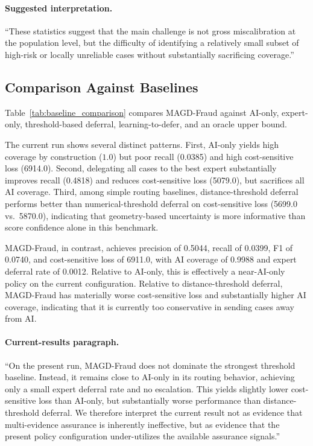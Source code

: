 \paragraph{Suggested interpretation.}
``These statistics suggest that the main challenge is not gross miscalibration at the population level, but the difficulty of identifying a relatively small subset of high-risk or locally unreliable cases without substantially sacrificing coverage.''

\subsection{Comparison Against Baselines}
\label{subsec:results_baselines}

Table~\ref{tab:baseline_comparison} compares MAGD-Fraud against AI-only, expert-only, threshold-based deferral, learning-to-defer, and an oracle upper bound.

The current run shows several distinct patterns. First, AI-only yields high coverage by construction ($1.0$) but poor recall (0.0385) and high cost-sensitive loss (6914.0). Second, delegating all cases to the best expert substantially improves recall (0.4818) and reduces cost-sensitive loss (5079.0), but sacrifices all AI coverage. Third, among simple routing baselines, distance-threshold deferral performs better than numerical-threshold deferral on cost-sensitive loss (5699.0 vs.\ 5870.0), indicating that geometry-based uncertainty is more informative than score confidence alone in this benchmark.

MAGD-Fraud, in contrast, achieves precision of 0.5044, recall of 0.0399, F1 of 0.0740, and cost-sensitive loss of 6911.0, with AI coverage of 0.9988 and expert deferral rate of 0.0012. Relative to AI-only, this is effectively a near-AI-only policy on the current configuration. Relative to distance-threshold deferral, MAGD-Fraud has materially worse cost-sensitive loss and substantially higher AI coverage, indicating that it is currently too conservative in sending cases away from AI.

\paragraph{Current-results paragraph.}
``On the present run, MAGD-Fraud does not dominate the strongest threshold baseline. Instead, it remains close to AI-only in its routing behavior, achieving only a small expert deferral rate and no escalation. This yields slightly lower cost-sensitive loss than AI-only, but substantially worse performance than distance-threshold deferral. We therefore interpret the current result not as evidence that multi-evidence assurance is inherently ineffective, but as evidence that the present policy configuration under-utilizes the available assurance signals.''

